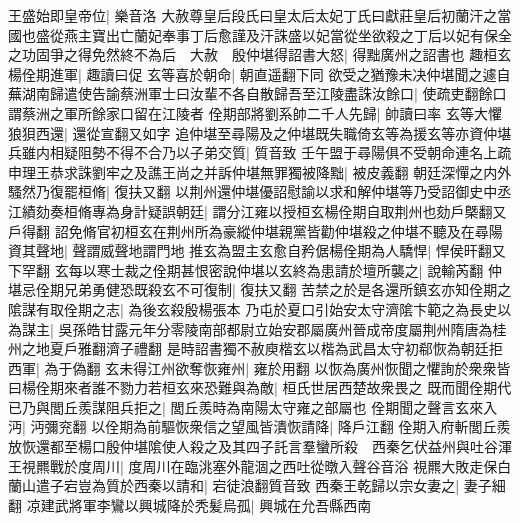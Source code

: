 王盛始即皇帝位|{
	樂音洛}
大赦尊皇后段氏曰皇太后太妃丁氏曰獻莊皇后初蘭汗之當國也盛從燕主寶出亡蘭妃奉事丁后愈謹及汗誅盛以妃當從坐欲殺之丁后以妃有保全之功固爭之得免然終不為后　大赦　殷仲堪得詔書大怒|{
	得黜廣州之詔書也}
趣桓玄楊佺期進軍|{
	趣讀曰促}
玄等喜於朝命|{
	朝直遥翻下同}
欲受之猶豫未决仲堪聞之遽自蕪湖南歸遣使告諭蔡洲軍士曰汝輩不各自散歸吾至江陵盡誅汝餘口|{
	使疏吏翻餘口謂蔡洲之軍所餘家口留在江陵者}
佺期部將劉系帥二千人先歸|{
	帥讀曰率}
玄等大懼狼狽西還|{
	還從宣翻又如字}
追仲堪至尋陽及之仲堪既失職倚玄等為援玄等亦資仲堪兵雖内相疑阻勢不得不合乃以子弟交質|{
	質音致}
壬午盟于尋陽俱不受朝命連名上疏申理王恭求誅劉牢之及譙王尚之并訴仲堪無罪獨被降黜|{
	被皮義翻}
朝廷深憚之内外騷然乃復罷桓脩|{
	復扶又翻}
以荆州還仲堪優詔慰諭以求和解仲堪等乃受詔御史中丞江績劾奏桓脩專為身計疑誤朝廷|{
	謂分江雍以授桓玄楊佺期自取荆州也劾戶槩翻又戶得翻}
詔免脩官初桓玄在荆州所為豪縱仲堪親黨皆勸仲堪殺之仲堪不聽及在尋陽資其聲地|{
	聲謂威聲地謂門地}
推玄為盟主玄愈自矜倨楊佺期為人驕悍|{
	悍侯旰翻又下罕翻}
玄每以寒士裁之佺期甚恨密說仲堪以玄終為患請於壇所襲之|{
	說輸芮翻}
仲堪忌佺期兄弟勇健恐既殺玄不可復制|{
	復扶又翻}
苦禁之於是各還所鎮玄亦知佺期之隂謀有取佺期之志|{
	為後玄殺殷楊張本}
乃屯於夏口引始安太守濟隂卞範之為長史以為謀主|{
	吳孫皓甘露元年分零陵南部都尉立始安郡屬廣州晉成帝度屬荆州隋唐為桂州之地夏戶雅翻濟子禮翻}
是時詔書獨不赦庾楷玄以楷為武昌太守初郗恢為朝廷拒西軍|{
	為于偽翻}
玄未得江州欲奪恢雍州|{
	雍於用翻}
以恢為廣州恢聞之懼詢於衆衆皆曰楊佺期來者誰不勠力若桓玄來恐難與為敵|{
	桓氏世居西楚故衆畏之}
既而聞佺期代已乃與閭丘羨謀阻兵拒之|{
	閭丘羨時為南陽太守雍之部屬也}
佺期聞之聲言玄來入沔|{
	沔彌兖翻}
以佺期為前驅恢衆信之望風皆潰恢請降|{
	降戶江翻}
佺期入府斬閭丘羨放恢還都至楊口殷仲堪隂使人殺之及其四子託言羣蠻所殺　西秦乞伏益州與吐谷渾王視羆戰於度周川|{
	度周川在臨洮塞外龍涸之西吐從暾入聲谷音浴}
視羆大敗走保白蘭山遣子宕豈為質於西秦以請和|{
	宕徒浪翻質音致}
西秦王乾歸以宗女妻之|{
	妻子細翻}
凉建武將軍李鸞以興城降於秃髪烏孤|{
	興城在允吾縣西南}


